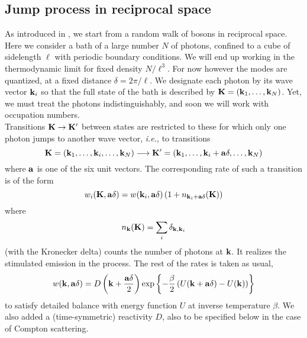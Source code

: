 \documentclass[a4paper,12pt,reqno,superscriptaddress,nofootinbib]{revtex4}
\newcommand{\0}{^{(0)}}
\newcommand{\1}{^{(1)}}
\newcommand{\2}{^{(2)}}
\begin{document}
\subsection{Jump process in reciprocal space}

As introduced in \cite{paper}, we start from a random walk of bosons in reciprocal space. Here we consider a bath of a large number $N$ of photons, confined to a cube of sidelength $\ell$ with 
periodic boundary conditions. We will end up working in the thermodynamic limit for fixed density $N/\ell^3$.  For now however the modes are quantized, at a fixed distance $\delta = 2\pi / \ell$.  We designate each photon by its wave vector $\vb{k}_i$ so that the full state of the bath is described by $\vb{K} = (\vb{k}_1, \dots, \vb{k}_N)$.  Yet, we must treat the photons indistinguishably, and soon we will work with occupation numbers.\\
Transitions $\vb{K}\rightarrow \vb{K}'$ between  states are restricted to 
these for which only one photon jumps to another wave vector, {\it i.e.}, to transitions
\[
\vb{K} = (\vb{k}_1, 
\dots,\vb{k}_i,\ldots, \vb{k}_N)\longrightarrow \vb{K}' = (\vb{k}_1, 
\dots, \vb{k}_i+\vb{a} \delta,\dots, \vb{k}_N)
\] 
where $\vb{a}$ is one of the six unit vectors. The corresponding rate of such a transition is of the form
\[
w_i(\vb{K}, \vb{a}\delta) = w(\vb{k}_i,\vb{a}\delta) \left(1 + n_{\vb{k}_i+\vb{a} \delta}(\vb{K} )\right)
\]
where
\[
n_{\vb{k}}(\vb{K}) = \sum_{i} \delta_{ \vb{k}, \vb{k}_i}
\]
(with the Kronecker delta) counts the number of photons at $\vb{k}$.  It realizes the stimulated emission in the process.  The rest of the rates is taken as usual,
\[
w(\vb{k},\vb{a}\delta) = D\left( \vb{k} + \frac{\vb{a} \delta}{2} \right)
\exp\left\{-\frac{\beta}{2}\left(U(\vb{k} + \vb{a} \delta) - 
U(\vb{k})\right)\right\}
\]
to satisfy detailed balance with energy function $U$ at inverse temperature $\beta$.   We also added a (time-symmetric) reactivity $D$, also to be specified below in the case of Compton scattering.\\
\end{document}
